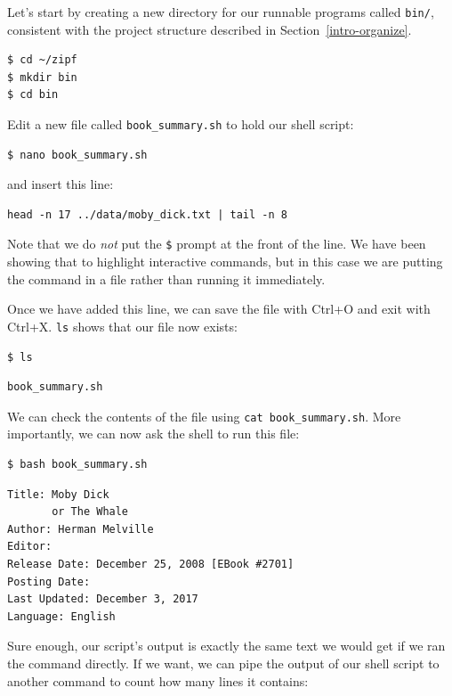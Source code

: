 \documentclass[
]{krantz}
\begin{document}
Let's start by creating a new directory for our runnable programs called \texttt{bin/},
consistent with the project structure described in Section~\ref{intro-organize}.

\begin{verbatim}
$ cd ~/zipf
$ mkdir bin
$ cd bin
\end{verbatim}

Edit a new file called \texttt{book\_summary.sh} to hold our shell script:

\begin{verbatim}
$ nano book_summary.sh
\end{verbatim}

and insert this line:

\begin{verbatim}
head -n 17 ../data/moby_dick.txt | tail -n 8
\end{verbatim}

Note that we do \emph{not} put the \texttt{\$} prompt at the front of the line.
We have been showing that to highlight interactive commands,
but in this case we are putting the command in a file rather than running it immediately.

Once we have added this line,
we can save the file with Ctrl+O
and exit with Ctrl+X.
\texttt{ls} shows that our file now exists:

\begin{verbatim}
$ ls
\end{verbatim}

\begin{verbatim}
book_summary.sh
\end{verbatim}

We can check the contents of the file using \texttt{cat\ book\_summary.sh}.
More importantly,
we can now ask the shell to run this file:

\begin{verbatim}
$ bash book_summary.sh
\end{verbatim}

\begin{verbatim}
Title: Moby Dick
       or The Whale
Author: Herman Melville
Editor:
Release Date: December 25, 2008 [EBook #2701]
Posting Date:
Last Updated: December 3, 2017
Language: English
\end{verbatim}

Sure enough,
our script's output is exactly the same text we would get if we ran the command directly.
If we want,
we can pipe the output of our shell script to another command to count how many lines it contains:
\end{document}
